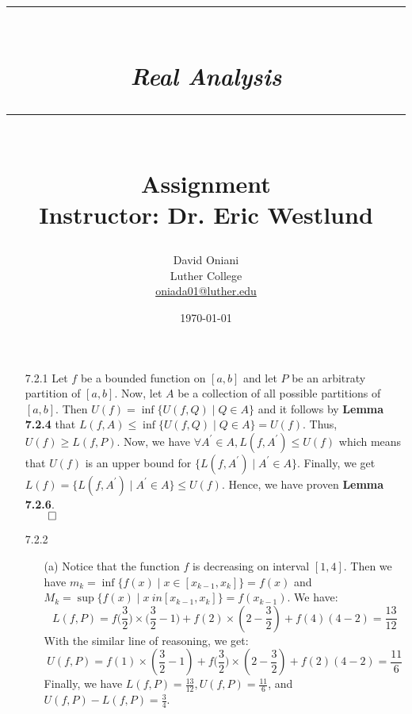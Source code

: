 \documentclass[11pt]{article}
\author{David Oniani\\
        Luther College\\
        \href{mailto:oniada01@luther.edu}{oniada01@luther.edu}}
\title{\rule{\paperwidth - 150pt}{1pt}\textbf{\\\textit{Real Analysis}\\}\rule
{\paperwidth - 150pt}{1pt}\\\textbf{Assignment \textnumero12}\\{\normalsize
Instructor: Dr. Eric Westlund}}
\date{\today}
\begin{document}
\maketitle

%
%
%

\begin{itemize}
    \item[7.2.1]
        Let $f$ be a bounded function on $[a, b]$ and let $P$ be an arbitraty
        partition of $[a, b]$. Now, let $A$ be a collection of all possible
        partitions of $[a, b]$. Then $U(f) = \inf \{U(f, Q) \mid Q \in A \}$
        and it follows by \textbf{Lemma 7.2.4} that $L(f, A) \leq \inf \{U(f,
        Q) \mid Q \in A\} = U(f)$. Thus, $U(f) \geq L(f, P)$. Now, we have
        $\forall A^\prime \in A, L(f, A^\prime) \leq U(f)$ which means that
        $U(f)$ is an upper bound for $\{L(f, A^\prime) \mid A^\prime \in A\}$.
        Finally, we get $L(f) = \{L(f, A^\prime) \mid A^\prime \in A\} \leq
        U(f)$. Hence, we have proven \textbf{Lemma 7.2.6}.\\
        $\qed$

    \item[7.2.2]
        \begin{itemize}
            \item[(a)]
                Notice that the function $f$ is decreasing on interval $[1,
                4]$. Then we have $m_k = \inf \{f(x) \mid x \in [x_{k - 1},
                x_k]\} = f(x)$ and $M_k = \sup \{f(x) \mid x \ in [x_{k - 1},
                x_k]\} = f(x_{k - 1})$. We have:
                \begin{equation*}
                    L(f, P) = f\Big(\frac{3}{2}\Big) \times
                                  \Big(\frac{3}{2} - 1\Big) + f(2)
                                  \times (2 - \frac{3}{2}) + f(4)(4 - 2)
                            = \frac{13}{12}
                \end{equation*}
                With the similar line of reasoning, we get:
                \begin{equation*}
                    U(f, P) = f(1) \times (\frac{3}{2} - 1) +
                                  f\Big(\frac{3}{2}\Big) \times
                                      (2 - \frac{3}{2}) + f(2)(4 - 2)
                            = \frac{11}{6}
                \end{equation*}
                Finally, we have $L(f, P) = \frac{13}{12}, U(f, P) =
                \frac{11}{6}$, and $U(f, P) - L(f, P) = \frac{3}{4}$.


\end{itemize}
\end{itemize}
\end{document}
